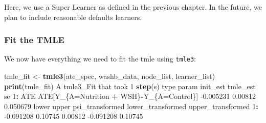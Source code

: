 \documentclass[12pt, krantz2,]{krantz}
\newenvironment{Shaded}{\begin{snugshade}}{\end{snugshade}}
\newcommand{\CommentTok}[1]{\textcolor[rgb]{0.37,0.37,0.37}{\textit{#1}}}
\newcommand{\DataTypeTok}[1]{\textcolor[rgb]{0.27,0.27,0.27}{#1}}
\newcommand{\DecValTok}[1]{\textcolor[rgb]{0.06,0.06,0.06}{#1}}
\newcommand{\FloatTok}[1]{\textcolor[rgb]{0.06,0.06,0.06}{#1}}
\newcommand{\KeywordTok}[1]{\textcolor[rgb]{0.27,0.27,0.27}{\textbf{#1}}}
\newcommand{\NormalTok}[1]{#1}
\newcommand{\OperatorTok}[1]{\textcolor[rgb]{0.43,0.43,0.43}{\textbf{#1}}}
\newcommand{\StringTok}[1]{\textcolor[rgb]{0.5,0.5,0.5}{#1}}
\theoremstyle{definition}
\theoremstyle{definition}
\theoremstyle{definition}
\newcommand{\1}{\mathbbm{1}}
\begin{document}
\begin{Shaded}
\end{Shaded}

Here, we use a Super Learner as defined in the previous chapter. In the future,
we plan to include reasonable defaults learners.

\hypertarget{fit-the-tmle}{%
\subsubsection{Fit the TMLE}\label{fit-the-tmle}}

We now have everything we need to fit the tmle using \texttt{tmle3}:

\begin{Shaded}
\begin{Highlighting}[]
\NormalTok{tmle_fit <-}\StringTok{ }\KeywordTok{tmle3}\NormalTok{(ate_spec, washb_data, node_list, learner_list)}
\KeywordTok{print}\NormalTok{(tmle_fit)}
\NormalTok{A tmle3_Fit that took }\DecValTok{1} \KeywordTok{step}\NormalTok{(s)}
\NormalTok{   type                                    param  init_est tmle_est       se}
\DecValTok{1}\OperatorTok{:}\StringTok{  }\NormalTok{ATE ATE[Y_\{A=Nutrition }\OperatorTok{+}\StringTok{ }\NormalTok{WSH\}}\OperatorTok{-}\NormalTok{Y_\{A=Control\}] }\FloatTok{-0.005231}  \FloatTok{0.00812} \FloatTok{0.050679}
\NormalTok{       lower   upper psi_transformed lower_transformed upper_transformed}
\DecValTok{1}\OperatorTok{:}\StringTok{ }\FloatTok{-0.091208} \FloatTok{0.10745}         \FloatTok{0.00812}         \FloatTok{-0.091208}           \FloatTok{0.10745}
\end{Highlighting}
\end{Shaded}
\end{document}
